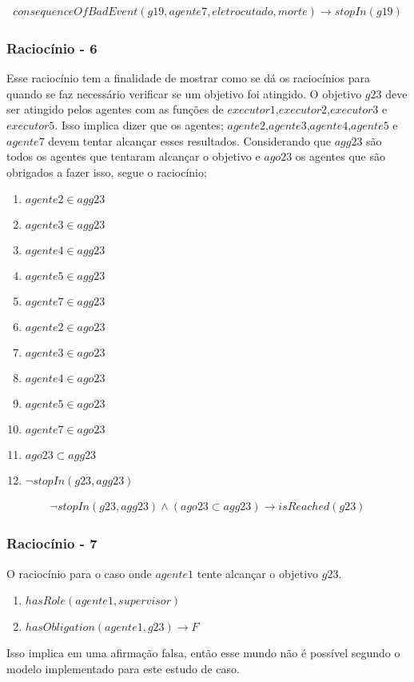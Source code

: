 \begin{eqnarray}
	consequenceOfBadEvent(g19,agente7,eletrocutado,morte) \to stopIn(g19)
\end{eqnarray}


\subsubsection{Raciocínio - 6}

Esse raciocínio tem a finalidade de mostrar como se dá os raciocínios para quando se faz necessário verificar se um objetivo foi atingido. 
O objetivo $g23$ deve ser atingido pelos agentes com as funções de $executor1$,$executor2$,$executor3$ e $executor5$. 
Isso implica dizer que os agentes; $agente2$,$agente3$,$agente4$,$agente5$ e $agente7$ devem tentar alcançar esses resultados. 
Considerando que $agg23$ são todos os agentes que tentaram alcançar o objetivo e $ago23$ os agentes que são obrigados a fazer isso, segue o raciocínio;


\begin{enumerate}
	\item $agente2 \in agg23$	
	\item $agente3 \in agg23$
	\item $agente4 \in agg23$
	\item $agente5 \in agg23$
	\item $agente7 \in agg23$								
	\item $agente2 \in ago23$	
	\item $agente3 \in ago23$
	\item $agente4 \in ago23$
	\item $agente5 \in ago23$
	\item $agente7 \in ago23$	
	\item $ago23 \subset agg23$
	\item $\neg stopIn(g23,agg23)$										
\end{enumerate}

\begin{eqnarray}\label{rel15}
	\neg stopIn(g23,agg23) \wedge (ago23 \subset agg23) \to isReached(g23)
\end{eqnarray}

\subsubsection{Raciocínio - 7}

O raciocínio para o caso onde $agente1$ tente alcançar o objetivo $g23$.  

\begin{enumerate}
	\item $hasRole(agente1,supervisor)$
	\item $hasObligation(agente1,g23) \to F$										
\end{enumerate}

Isso implica em uma afirmação falsa, então esse mundo não é possível segundo o modelo implementado para este estudo de caso.